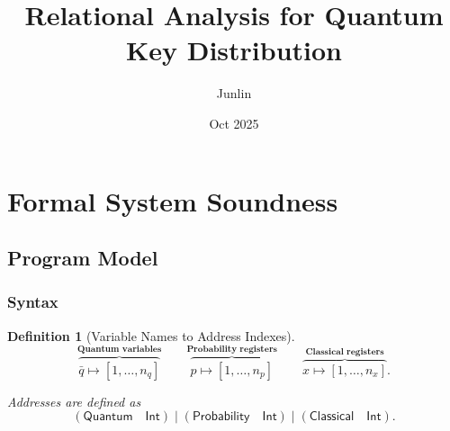\documentclass[acmsmall,screen,review,anonymous,nonacm]{acmart}
\title{Relational Analysis for Quantum Key Distribution}
\author{Junlin}
\date{Oct 2025}
\newtheorem{definition}{Definition}[section]
\theoremstyle{defn_style}
\begin{document}
\maketitle

\section{Formal System Soundness}

\subsection{Program Model}
\subsubsection{Syntax}

\begin{definition}[Variable Names to Address Indexes]
  \[
  \overset{\textbf{Quantum variables}}{\overbrace{
  \bar q \mapsto [1,\ldots,n_q]
  }}
  \qquad
  \overset{\textbf{Probability registers}}{\overbrace{
  p \mapsto [1,\ldots,n_p]
  }}
  \qquad
  \overset{\textbf{Classical registers}}{\overbrace{
  x \mapsto [1,\ldots,n_x]
  }} .
  \]
  
  Addresses are defined as
  \[
  (\mathsf{Quantum}\quad \mathsf{Int})
  \mid
  (\mathsf{Probability}\quad \mathsf{Int})
  \mid
  (\mathsf{Classical}\quad \mathsf{Int}) .
  \]
  \end{definition}
\end{document}
